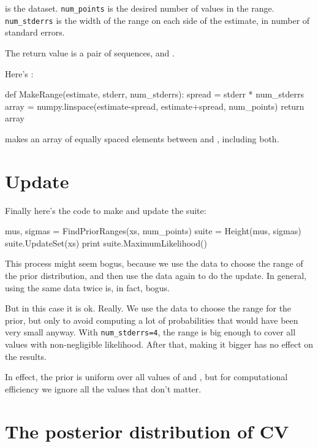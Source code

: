 \documentclass[12pt]{book}
\theoremstyle{exercise}
\begin{document}
 is the dataset.  \verb"num_points" is the desired number of
values in the range.  \verb"num_stderrs" is the width of the range on
each side of the estimate, in number of standard errors.

The return
value is a pair of sequences,  and .

Here's :

\begin{code}
def MakeRange(estimate, stderr, num_stderrs):
    spread = stderr * num_stderrs
    array = numpy.linspace(estimate-spread,
                           estimate+spread,
                           num_points)
    return array
\end{code}

 makes an array of equally spaced elements between
 and , including both.


\section{Update}

Finally here's the code to make and update the suite:

\begin{code}
    mus, sigmas = FindPriorRanges(xs, num_points)
    suite = Height(mus, sigmas)
    suite.UpdateSet(xs)
    print suite.MaximumLikelihood()    
\end{code}

This process might seem bogus, because we use the data to choose the
range of the prior distribution, and then use the data again to do the
update.  In general, using the same data twice is, in fact, bogus.

But in this case it is ok.  Really.  We use the data to choose the
range for the prior, but only to avoid computing a lot of
probabilities that would have been very small anyway.  With
\verb"num_stderrs=4", the range is big enough to cover all values with
non-negligible likelihood.  After that, making it bigger has no effect
on the results.

In effect, the prior is uniform over all values 
of  and , but for computational efficiency
we ignore all the values that don't matter.

\section{The posterior distribution of CV}
\end{document}
